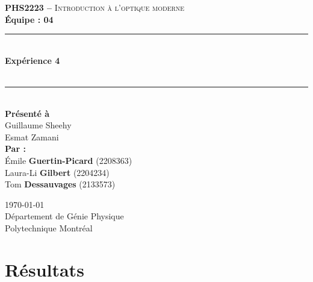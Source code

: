 \documentclass[11pt,letterpaper]{article}
\begin{document}
\begin{titlepage}
\center

\begin{figure}
\end{figure}
\vspace*{2 cm}

\textsc{\Large \textbf{PHS2223 --} Introduction à l'optique moderne}\\[0.5cm]
\large{\textbf{Équipe : 04}}\\[1.5cm]

\rule{\linewidth}{0.5mm} \\[0.5cm]
\Large{\textbf{Expérience 4}} \\[0.2cm]
\\
\rule{\linewidth}{0.2mm} \\[2.3cm]

\large{\textbf{Présenté à}\\
  Guillaume Sheehy\\
  Esmat Zamani\\[2.5cm]
  \textbf{Par :}\\
  Émile \textbf{Guertin-Picard} (2208363)\\
  Laura-Li \textbf{Gilbert} (2204234)\\
  Tom \textbf{Dessauvages} (2133573)\\[3cm]}

\large{\today\\
Département de Génie Physique\\
Polytechnique Montréal\\}

\end{titlepage}


\tableofcontents
{}
\newpage

\pagestyle{fancy}
\setlength{\headheight}{14pt}
\renewcommand{\headrulewidth}{0pt}
\fancyfoot[R]{\thepage}

\pagestyle{fancy}
\fancyhf{}
\renewcommand{\headrulewidth}{1pt}
\fancyhead[R]{\today}
\fancyfoot[R]{\thepage}

\setcounter{page}{1}


\section{Résultats}
\end{document}
